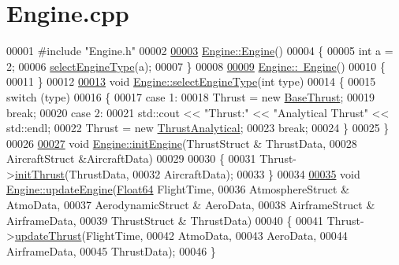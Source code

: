 \hypertarget{_engine_8cpp_source}{}\section{Engine.\+cpp}
\label{_engine_8cpp_source}

\begin{DoxyCode}
00001 \textcolor{preprocessor}{#include "Engine.h"}
00002 
\hyperlink{group___engine_a8c98683b0a3aa28d8ab72a8bcd0d52f2}{00003} \hyperlink{group___engine_a8c98683b0a3aa28d8ab72a8bcd0d52f2}{Engine::Engine}()
00004 \{
00005     \textcolor{keywordtype}{int} a = 2;
00006     \hyperlink{group___engine_ac33371d6fff86c0c8e14495f10046d9a}{selectEngineType}(a);
00007 \}
00008 
\hyperlink{group___engine_a8ef7030a089ecb30bbfcb9e43094717a}{00009} \hyperlink{group___engine_a8ef7030a089ecb30bbfcb9e43094717a}{Engine::~Engine}()
00010 \{
00011 \}
00012 
\hyperlink{group___engine_ac33371d6fff86c0c8e14495f10046d9a}{00013} \textcolor{keywordtype}{void} \hyperlink{group___engine_ac33371d6fff86c0c8e14495f10046d9a}{Engine::selectEngineType}(\textcolor{keywordtype}{int} type)
00014 \{
00015     \textcolor{keywordflow}{switch} (type)
00016     \{
00017     \textcolor{keywordflow}{case} 1:
00018         Thrust = \textcolor{keyword}{new} \hyperlink{group___engine_class_base_thrust}{BaseThrust}; 
00019         \textcolor{keywordflow}{break};
00020     \textcolor{keywordflow}{case} 2:
00021         std::cout << \textcolor{stringliteral}{"Thrust:"} << \textcolor{stringliteral}{"Analytical Thrust"} << std::endl;
00022         Thrust = \textcolor{keyword}{new} \hyperlink{group___engine_class_thrust_analytical}{ThrustAnalytical};
00023         \textcolor{keywordflow}{break};
00024     \}
00025 \}
00026 
\hyperlink{group___engine_aee607dba02101af5b299920f89b56e79}{00027} \textcolor{keywordtype}{void} \hyperlink{group___engine_aee607dba02101af5b299920f89b56e79}{Engine::initEngine}(ThrustStruct & ThrustData,
00028                         AircraftStruct &AircraftData)
00029             
00030 \{
00031     Thrust->\hyperlink{group___engine_a02b3fe7f763d84c5d34b59f124eaf455}{initThrust}(ThrustData,
00032                        AircraftData);
00033 \}
00034 
\hyperlink{group___engine_a9e16100ffd33cf8ec632257795c03865}{00035} \textcolor{keywordtype}{void} \hyperlink{group___engine_a9e16100ffd33cf8ec632257795c03865}{Engine::updateEngine}(\hyperlink{group___tools_ga3f1431cb9f76da10f59246d1d743dc2c}{Float64} FlightTime,
00036                         AtmosphereStruct & AtmoData,
00037                         AerodynamicStruct & AeroData,
00038                         AirframeStruct & AirframeData,
00039                         ThrustStruct & ThrustData)
00040 \{
00041     Thrust->\hyperlink{group___engine_a869359a1b2b7cddcbe5979d6a1cf5eac}{updateThrust}(FlightTime,
00042                          AtmoData,
00043                          AeroData,
00044                          AirframeData,
00045                          ThrustData);
00046 \}
\end{DoxyCode}
